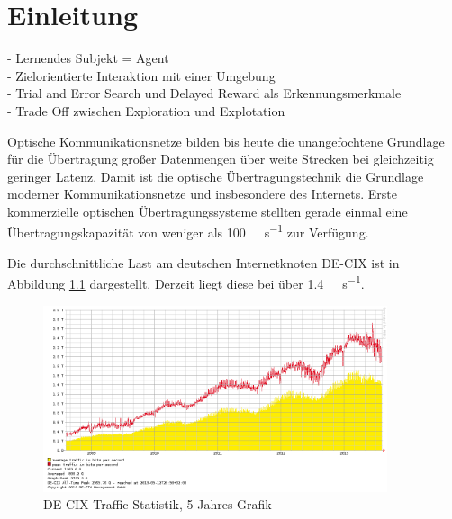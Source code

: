 \chapter{Einleitung}


- Lernendes Subjekt = Agent\\
- Zielorientierte Interaktion mit einer Umgebung\\
- Trial and Error Search und Delayed Reward als Erkennungsmerkmale\\
- Trade Off zwischen Exploration und Explotation







\iffalse



Optische Kommunikationsnetze bilden bis heute die unangefochtene Grundlage für die Übertragung großer Datenmengen über weite Strecken bei gleichzeitig geringer Latenz.
Damit ist die optische Übertragungstechnik die Grundlage moderner Kommunikationsnetze und insbesondere des Internets.
Erste kommerzielle optischen Übertragungssysteme stellten gerade einmal eine Übertragungskapazität von weniger als \SI{100}{\mega\bit\per\second} zur Verfügung.\par\medskip
Die durchschnittliche Last am deutschen Internetknoten DE-CIX ist in Abbildung \ref{fig:DE-CIX} dargestellt. Derzeit liegt diese bei über \SI{1,4}{\tera\bit\per\second}.

\begin{figure}[ht!]
 \centering
 \includegraphics[keepaspectratio,width=0.9\textwidth]{abbildungen/de-cix_5y_20130804.png}
 \caption{DE-CIX Traffic Statistik, 5 Jahres Grafik \protect\footnotemark[1]}
 \label{fig:DE-CIX}
\end{figure}

